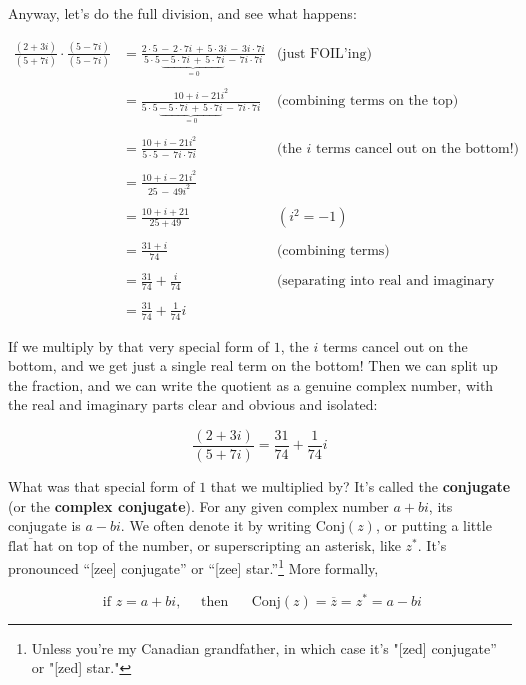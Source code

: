 \documentclass[
]{article}
\begin{document}
Anyway, let's do the full division, and see what happens:

\[
\begin{align*}
\frac{(2+3i)}{(5+7i)}\cdot\frac{(5-7i)}{(5-7i)} &= \frac{2\cdot5 \,-\, 2\cdot7i \,+\, 5\cdot3i \,-\, 3i\cdot7i}{5\cdot5 \,\underbrace{-\, 5\cdot7i \,+\, 5\cdot7i}_{=0} \,-\, 7i\cdot7i} & \text{(just FOIL'ing)} \\ \\
&= \frac{10+i-21i^2}{5\cdot5 \,\underbrace{-\, 5\cdot7i \,+\, 5\cdot7i}_{=0} \,-\, 7i\cdot7i} & \text{(combining terms on the top)} \\ \\
&= \frac{10+i-21i^2}{5\cdot5 \,-\, 7i\cdot7i} & \text{(the $i$ terms cancel out on the bottom!)} \\ \\
&= \frac{10+i-21i^2}{25 \,-\, 49i^2} & \\ \\
&= \frac{10+i+21}{25 + 49} & (i^2=-1)\\ \\
&= \frac{31+i}{74} & \text{(combining terms)}\\ \\
&= \frac{31}{74} + \frac{i}{74} &\text{(separating into real and imaginary components)}\\ \\
&= \frac{31}{74} + \frac{1}{74}i
\end{align*}
\]

If we multiply by that very special form of \(1\), the \(i\) terms
cancel out on the bottom, and we get just a single real term on the
bottom! Then we can split up the fraction, and we can write the quotient
as a genuine complex number, with the real and imaginary parts clear and
obvious and isolated:

\[\frac{(2+3i)}{(5+7i)}= \frac{31}{74} + \frac{1}{74}i\]

What was that special form of \(1\) that we multiplied by? It's called
the \textbf{conjugate} (or the \textbf{complex conjugate}). For any
given complex number \(a+bi\), its conjugate is \(a-bi\). We often
denote it by writing \(\text{Conj}(z)\), or putting a little
\(\overline{\text{flat hat}}\) on top of the number, or superscripting
an asterisk, like \(z^*\). It's pronounced ``{[}zee{]} conjugate'' or
``{[}zee{]}
star.''\footnote{Unless you're my Canadian grandfather, in which case it's "[zed] conjugate'' or "[zed] star."}
More formally,

\[\text{ if } z=a+bi,\quad \text{ then $\quad$ Conj}(z)=\overline{z} = z^*= a-bi\]
\end{document}
